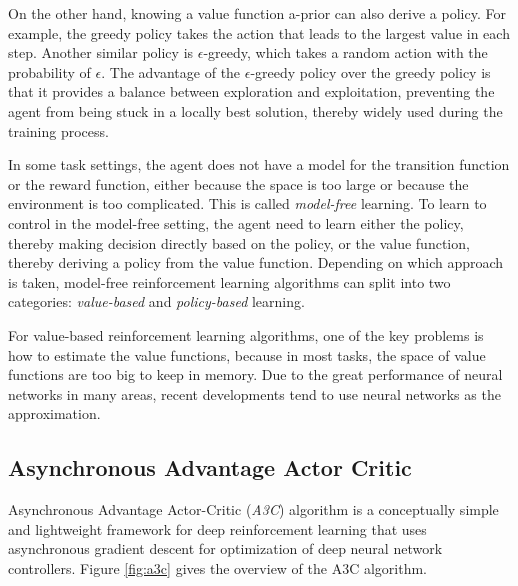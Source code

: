         On the other hand, knowing a value function a-prior can also derive a policy.
        For example, the greedy policy takes the action that leads to the largest value in each step.
        Another similar policy is $\epsilon$-greedy,
        which takes a random action with the probability of $\epsilon$.
        The advantage of the $\epsilon$-greedy policy over the greedy policy is that
        it provides a balance between exploration and exploitation,
        preventing the agent from being stuck in a locally best solution,
        thereby widely used during the training process.

        In some task settings,
        the agent does not have a model for the transition function or the reward function,
        either because the space is too large or because the environment is too complicated.
        This is called \emph{model-free} learning.
        To learn to control in the model-free setting, the agent need to learn either
        the policy, thereby making decision directly based on the policy,
        or the value function, thereby deriving a policy from the value function.
        Depending on which approach is taken,
        model-free reinforcement learning algorithms can split into two categories:
        \emph{value-based} and \emph{policy-based} learning.

        For value-based reinforcement learning algorithms,
        one of the key problems is how to estimate the value functions,
        because in most tasks, the space of value functions are too big to keep in memory.
        Due to the great performance of neural networks in many areas,
        recent developments tend to use neural networks as the approximation.

    \subsection{Asynchronous Advantage Actor Critic}

        Asynchronous Advantage Actor-Critic \cite{mnih_asynchronous_2016} (\emph{A3C}) algorithm is
        a conceptually simple and lightweight framework for deep reinforcement learning
        that uses asynchronous gradient descent for optimization of deep neural network controllers.
        Figure \ref{fig:a3c} gives the overview of the A3C algorithm.

